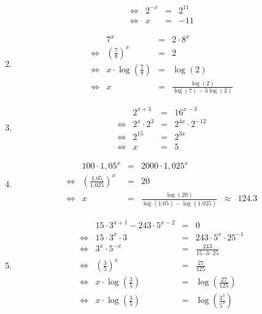 \begin{oef}
\begin{opl}
\begin{enumerate}
\[\begin{array}{rrclcl}
            \iff & 2^{-x} & = & 2^{11} \\
            \iff & x & = & -11
          \end{array}
        \]
  \item \[
          \begin{array}{rrclcl}
                 & 7^x & = & 2 \cdot 8^x \\[2mm]
            \iff & \displaystyle\left(\frac78\right)^x & = & 2 \\[2mm]
            \iff & \displaystyle x \cdot \log(\frac78) & = & \log(2) \\[2mm]
            \iff & x & = & \displaystyle \frac{\log(2)}{\log(7) - 3 \log(2)}
          \end{array}
        \]
  \item \[
          \begin{array}{rrclcl}
                 & 2^{x+3} & = & 16^{x-3} \\
            \iff & 2^x \cdot 2^3 & = & 2^{4x} \cdot 2^{-12} \\
            \iff & 2^{15} & = & 2^{3x} \\
            \iff & x & = & 5
          \end{array}
        \]
  \item \[
          \begin{array}{rrclcl}
                 & 100 \cdot 1,05^x & = & 2000\cdot 1,025^x \\[2mm]
            \iff & \displaystyle\left(\frac{1.05}{1.025}\right)^x & = & 20 \\[2mm]
            \iff & x & = & \displaystyle \frac{\log(20)}{\log(1.05)-\log(1.025)} & \approx & 124.3
          \end{array}
        \]
  \item \[
          \begin{array}{rrclcl}
                 & 15 \cdot 3^{x+1}-243 \cdot 5^{x-2} & = & 0 \\ 
            \iff & 15 \cdot 3^x \cdot 3 & = & 243 \cdot 5^x \cdot 25^{-1} \\[2mm]
            \iff & 3^x \cdot 5^{-x} & = & \displaystyle \frac{243}{15 \cdot 3 \cdot 25} \\[2mm]
            \iff & \displaystyle \left(\frac{3}{5}\right)^x & = & \displaystyle \frac{27}{125} \\[2mm]
            \iff & \displaystyle x \cdot \log\left(\frac{3}{5}\right) & = & \displaystyle \log\left(\frac{27}{125}\right) \\[2mm]
            \iff & \displaystyle x \cdot \log\left(\frac{3}{5}\right) & = & \displaystyle \log\left(\frac{3^3}{5^3}\right) \\[2mm]

\end{array}\]
\end{enumerate}
\end{opl}
\end{oef}
